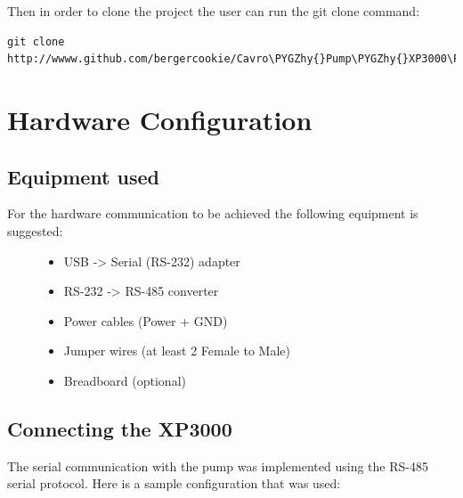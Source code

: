 \documentclass[letterpaper,10pt,english]{sphinxmanual}
\def\PYGZhy{\char`\-}
\begin{document}
Then in order to clone the project the user can run the git clone command:

\begin{Verbatim}[commandchars=\\\{\}]
git clone http://wwww.github.com/bergercookie/Cavro\PYGZhy{}Pump\PYGZhy{}XP3000\PYGZhy{}GUI.git
\end{Verbatim}


\section{Hardware Configuration}
\label{hardware:hardware-configuration}\label{hardware::doc}

\subsection{Equipment used}
\label{hardware:equipment-used}\begin{description}
\item[{For the hardware communication to be achieved the following equipment is suggested:}] \leavevmode\begin{itemize}
\item {} 
USB    -\textgreater{}  Serial (RS-232) adapter

\item {} 
RS-232 -\textgreater{}  RS-485 converter

\item {} 
Power cables (Power + GND)

\item {} 
Jumper wires (at least 2 Female to Male)

\item {} 
Breadboard (optional)

\end{itemize}

\end{description}


\subsection{Connecting the XP3000}
\label{hardware:connecting-the-xp3000}
The serial communication with the pump was implemented using the RS-485 serial
protocol. Here is a sample configuration that was used:
\end{document}
